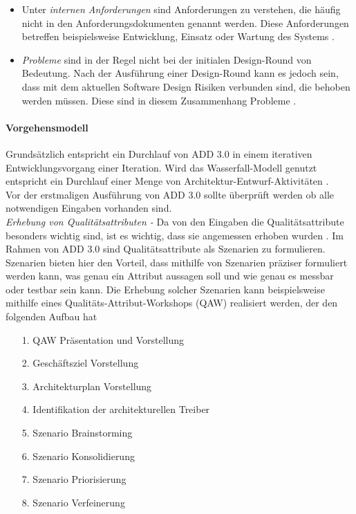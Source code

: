 \begin{itemize}
\begin{itemize}
\item Unter \emph{internen Anforderungen} sind Anforderungen zu verstehen, die h\"aufig nicht in den Anforderungsdokumenten genannt werden. Diese Anforderungen betreffen beispielsweise Entwicklung, Einsatz oder Wartung des Systems \cite{Cer01}.  
\item \emph{Probleme} sind in der Regel nicht bei der initialen Design-Round von Bedeutung. Nach der Ausf\"uhrung einer Design-Round kann es jedoch sein, dass mit dem aktuellen Software Design Risiken verbunden sind, die behoben werden m\"ussen. Diese sind in diesem Zusammenhang Probleme \cite{Cer01}.\\
\end{itemize}
\end{itemize}

\paragraph{Vorgehensmodell}
Grunds\"atzlich entspricht ein Durchlauf von ADD 3.0 in einem iterativen Entwicklungsvorgang einer Iteration. Wird das Wasserfall-Modell genutzt entspricht ein Durchlauf einer Menge von Architektur-Entwurf-Aktivit\"aten \cite{Cer01}.\\

Vor der erstmaligen Ausf\"uhrung von ADD 3.0 sollte \"uberpr\"uft werden ob alle notwendigen Eingaben vorhanden sind.\\

\emph{Erhebung von Qualit\"atsattributen -}
Da von den Eingaben die Qualit\"atsattribute besonders wichtig sind, ist es wichtig, dass sie angemessen erhoben wurden \cite{Cer01}. Im Rahmen von ADD 3.0 sind Qualit\"atsattribute als Szenarien zu formulieren. Szenarien bieten hier den Vorteil, dass mithilfe von Szenarien pr\"aziser formuliert werden kann, was genau ein Attribut aussagen soll und wie genau es messbar oder testbar sein kann. Die Erhebung solcher Szenarien kann beispielsweise mithilfe eines Qualit\"ats-Attribut-Workshops (QAW) realisiert werden, der den folgenden Aufbau hat \cite{Cer01}\\

\begin{itemize}
\item[1.] QAW Pr\"asentation und Vorstellung
\item[2.] Gesch\"aftsziel Vorstellung
\item[3.] Architekturplan Vorstellung
\item[4.] Identifikation der architekturellen Treiber
\item[5.] Szenario Brainstorming
\item[6.] Szenario Konsolidierung
\item[7.] Szenario Priorisierung
\item[8.] Szenario Verfeinerung \\
\end{itemize}


